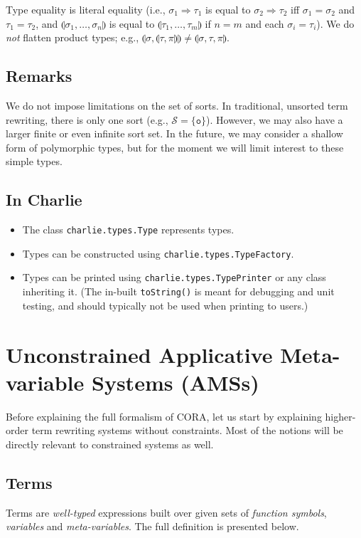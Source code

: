\documentclass{lmcs}
\theoremstyle{theorem}\newtheorem{theorem}{Theorem}
\theoremstyle{theorem}\newtheorem{lemma}[theorem]{Lemma}
\theoremstyle{theorem}\newtheorem{corollary}[theorem]{Corollary}
\theoremstyle{definition}\newtheorem{definition}[theorem]{Definition}
\theoremstyle{definition}\newtheorem{example}[theorem]{Example}
\newcommand{\Sorts}{\mathcal{S}}
\newcommand{\atype}{\sigma}
\newcommand{\btype}{\tau}
\newcommand{\ctype}{\pi}
\newcommand{\product}[2]{\llparenthesis #1,\dots,#2 \rrparenthesis}
\newcommand{\pair}[2]{\llparenthesis #1,#2 \rrparenthesis}
\newcommand{\triple}[3]{\llparenthesis #1,#2,#3 \rrparenthesis}
\newcommand{\arrtype}{\Rightarrow}
\newcommand{\unitsort}{\mathtt{o}}
\newcommand{\cora}{\textsf{CORA}\xspace}
\newcommand{\charlie}{\textsf{Charlie}\xspace}
\begin{document}
\bigskip
Type equality is literal equality (i.e., $\atype_1 \arrtype \btype_1$ is equal
to $\atype_2 \arrtype \btype_2$ iff $\atype_1 = \atype_2$ and $\btype_1 =
\btype_2$, and $\product{\atype_1}{\atype_n}$ is equal to
$\product{\btype_1}{\btype_m}$ if $n = m$ and each $\atype_i = \btype_i$).
We do \emph{not} flatten product types; e.g.,
$\pair{\atype}{\pair{\btype}{\ctype}} \neq \triple{\atype}{\btype}{\ctype}$.

\subsection*{Remarks}

We do not impose limitations on the set of sorts.  In traditional, unsorted term
rewriting, there is only one sort (e.g., $\Sorts = \{ \unitsort \}$). However,
we may also have a larger finite or even infinite sort set.
In the future, we may consider a shallow form of polymorphic types, but for the
moment we will limit interest to these simple types.

\subsection*{In \charlie}

\begin{itemize}
\item The class \texttt{charlie.types.Type} represents types.
\item Types can be constructed using \texttt{charlie.types.TypeFactory}.
\item Types can be printed using \texttt{charlie.types.TypePrinter} or any class
  inheriting it.
  (The in-built \texttt{toString()} is meant for debugging and unit testing, and
  should typically not be used when printing to users.)
\end{itemize}

\section{Unconstrained Applicative Meta-variable Systems (AMSs)}

Before explaining the full formalism of \cora, let us start by explaining
higher-order term rewriting systems without constraints.  Most of the notions
will be directly relevant to constrained systems as well.

\subsection{Terms}
Terms are \emph{well-typed} expressions built over given sets of \emph{function
symbols}, \emph{variables} and \emph{meta-variables}. The full definition is
presented below.
\end{document}

